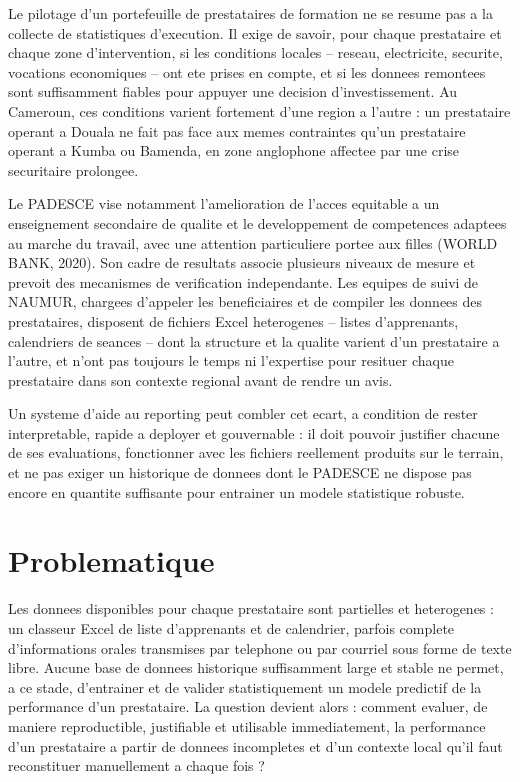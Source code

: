\documentclass[12pt,a4paper,twoside,openany]{report}
\begin{document}
Le pilotage d'un portefeuille de prestataires de formation ne se resume pas a la collecte de statistiques d'execution. Il exige de savoir, pour chaque prestataire et chaque zone d'intervention, si les conditions locales -- reseau, electricite, securite, vocations economiques -- ont ete prises en compte, et si les donnees remontees sont suffisamment fiables pour appuyer une decision d'investissement. Au Cameroun, ces conditions varient fortement d'une region a l'autre : un prestataire operant a Douala ne fait pas face aux memes contraintes qu'un prestataire operant a Kumba ou Bamenda, en zone anglophone affectee par une crise securitaire prolongee.

Le PADESCE vise notamment l'amelioration de l'acces equitable a un enseignement secondaire de qualite et le developpement de competences adaptees au marche du travail, avec une attention particuliere portee aux filles (WORLD BANK, 2020). Son cadre de resultats associe plusieurs niveaux de mesure et prevoit des mecanismes de verification independante. Les equipes de suivi de NAUMUR, chargees d'appeler les beneficiaires et de compiler les donnees des prestataires, disposent de fichiers Excel heterogenes -- listes d'apprenants, calendriers de seances -- dont la structure et la qualite varient d'un prestataire a l'autre, et n'ont pas toujours le temps ni l'expertise pour resituer chaque prestataire dans son contexte regional avant de rendre un avis.

Un systeme d'aide au reporting peut combler cet ecart, a condition de rester interpretable, rapide a deployer et gouvernable : il doit pouvoir justifier chacune de ses evaluations, fonctionner avec les fichiers reellement produits sur le terrain, et ne pas exiger un historique de donnees dont le PADESCE ne dispose pas encore en quantite suffisante pour entrainer un modele statistique robuste.

\section*{Problematique}

Les donnees disponibles pour chaque prestataire sont partielles et heterogenes : un classeur Excel de liste d'apprenants et de calendrier, parfois complete d'informations orales transmises par telephone ou par courriel sous forme de texte libre. Aucune base de donnees historique suffisamment large et stable ne permet, a ce stade, d'entrainer et de valider statistiquement un modele predictif de la performance d'un prestataire. La question devient alors : comment evaluer, de maniere reproductible, justifiable et utilisable immediatement, la performance d'un prestataire a partir de donnees incompletes et d'un contexte local qu'il faut reconstituer manuellement a chaque fois ?
\end{document}
